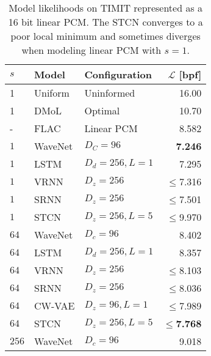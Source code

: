 {\begin{table}
    \caption[Model likelihoods on TIMIT represented as a 16 bit linear PCM.]{
    Model likelihoods on TIMIT represented as a 16 bit linear PCM. The STCN converges to a poor local minimum and sometimes diverges when modeling linear PCM with $s=1$.
    }
    \centering
    \begin{tabular}{ll|lr}
        \toprule
        $s$    & \bfseries Model           & \bfseries Configuration           & \bfseries $\mathcal{L}$ [bpf] \\
        \midrule
        1         & Uniform             & Uninformed            & 16.00 \\
        1         & DMoL                & Optimal               & 10.70 \\   %
        -         & FLAC                & Linear PCM            & 8.582 \\
        \midrule
        $1$       & WaveNet             & $D_C=96$              & \textbf{7.246} \\
        $1$       & LSTM                & $D_d=256, L=1$        & 7.295 \\
        $1$       & VRNN                & $D_z=256$             & $\leq$7.316 \\
        $1$       & SRNN                & $D_z=256$             & $\leq$7.501 \\
        $1$       & STCN                & $D_z=256,L=5$         & $\leq$9.970 \\
        \midrule
        $64$      & WaveNet             & $D_c=96$              & 8.402 \\
        $64$      & LSTM                & $D_d=256, L=1$        & 8.357 \\
        $64$      & VRNN                & $D_z=256$             & $\leq$8.103 \\
        $64$      & SRNN                & $D_z=256$             & $\leq$8.036 \\
        $64$      & CW-VAE              & $D_z=96, L=1$         & $\leq$7.989 \\
        $64$      & STCN                & $D_z=256,L=5$  & $\leq$\textbf{7.768} \\
        \midrule
        $256$      & WaveNet             & $D_c=96$              & 9.018 \\

\end{tabular}
\end{table}}
